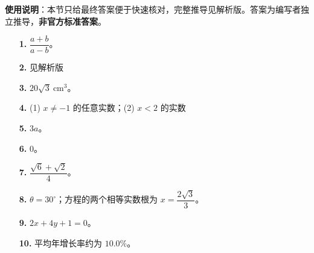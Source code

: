 
\begin{gknotice}
\textbf{使用说明}：本节只给最终答案便于快速核对，完整推导见解析版。答案为编写者独立推导，\textbf{非官方标准答案}。
\end{gknotice}

\begin{itemize}[leftmargin=2.6em]
  \item[\textbf{1.}] $\dfrac{a+b}{a-b}$。
  \item[\textbf{2.}] 见解析版
  \item[\textbf{3.}] $20\sqrt3\ \mathrm{cm^3}$。
  \item[\textbf{4.}] (1) $x\ne-1$ 的任意实数；(2) $x<2$ 的实数
  \item[\textbf{5.}] $3a$。
  \item[\textbf{6.}] $0$。
  \item[\textbf{7.}] $\dfrac{\sqrt6+\sqrt2}{4}$。
  \item[\textbf{8.}] $\theta=30^\circ$；方程的两个相等实数根为 $x=\dfrac{2\sqrt3}{3}$。
  \item[\textbf{9.}] $2x+4y+1=0$。
  \item[\textbf{10.}] 平均年增长率约为 $10.0\%$。
\end{itemize}
